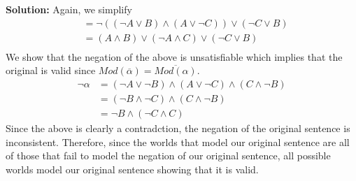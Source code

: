 \documentclass[11pt]{exam}
\begin{document}
\begin{questions}
\textbf{Solution:} Again, we simplify
\begin{align*}
&= \neg((\neg A \lor B) \land (A \lor \neg C)) \lor (\neg C \lor B)\\
&= (A \land B) \lor (\neg A \land C) \lor (\neg C \lor B)\\
\end{align*}
We show that the negation of the above is unsatisfiable which implies that the original is valid since $Mod(\overline{\alpha}) = \overline{ Mod(\alpha)}$.
\begin{align*}
\neg \alpha &= (\neg A \lor \neg B) \land (A \lor \neg C) \land (C \land \neg B)\\
&= (\neg B \land \neg C) \land (C \land \neg B)\\
&= \neg B \land (\neg C \land C)
\end{align*}
Since the above is clearly a contradction, the negation of the original sentence is inconsistent. Therefore, since the worlds that model our original sentence are all of those that fail to model the negation of our original sentence, all possible worlds model our original sentence showing that it is valid.
\end{questions}
\end{document}
